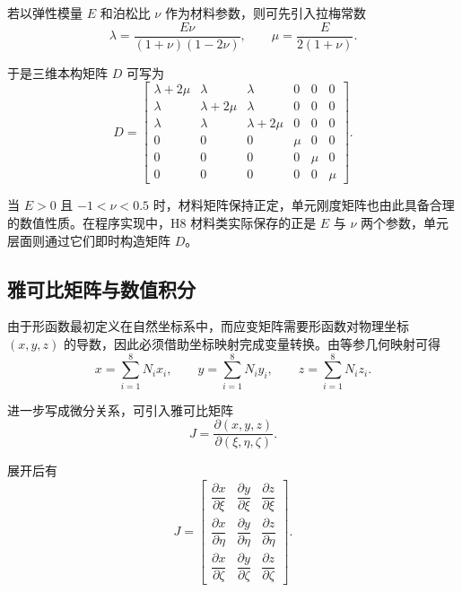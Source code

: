 \documentclass[12pt,a4paper]{article}
\begin{document}
若以弹性模量 $E$ 和泊松比 $\nu$ 作为材料参数，则可先引入拉梅常数
\begin{equation}
\lambda=\frac{E\nu}{(1+\nu)(1-2\nu)},
\qquad
\mu=\frac{E}{2(1+\nu)}.
\end{equation}

于是三维本构矩阵 $D$ 可写为
\begin{equation}
D=
\begin{bmatrix}
\lambda+2\mu & \lambda & \lambda & 0 & 0 & 0 \\
\lambda & \lambda+2\mu & \lambda & 0 & 0 & 0 \\
\lambda & \lambda & \lambda+2\mu & 0 & 0 & 0 \\
0 & 0 & 0 & \mu & 0 & 0 \\
0 & 0 & 0 & 0 & \mu & 0 \\
0 & 0 & 0 & 0 & 0 & \mu
\end{bmatrix}.
\end{equation}

当 $E>0$ 且 $-1<\nu<0.5$ 时，材料矩阵保持正定，单元刚度矩阵也由此具备合理的数值性质。在程序实现中，H8 材料类实际保存的正是 $E$ 与 $\nu$ 两个参数，单元层面则通过它们即时构造矩阵 $D$。

\subsection{雅可比矩阵与数值积分}

由于形函数最初定义在自然坐标系中，而应变矩阵需要形函数对物理坐标 $(x,y,z)$ 的导数，因此必须借助坐标映射完成变量转换。由等参几何映射可得
\begin{equation}
x=\sum_{i=1}^{8}N_i x_i,\qquad y=\sum_{i=1}^{8}N_i y_i,\qquad z=\sum_{i=1}^{8}N_i z_i.
\end{equation}

进一步写成微分关系，可引入雅可比矩阵
\begin{equation}
J = \frac{\partial(x,y,z)}{\partial(\xi,\eta,\zeta)}.
\end{equation}

展开后有
\begin{equation}
J=
\begin{bmatrix}
\dfrac{\partial x}{\partial \xi} & \dfrac{\partial y}{\partial \xi} & \dfrac{\partial z}{\partial \xi} \\
\dfrac{\partial x}{\partial \eta} & \dfrac{\partial y}{\partial \eta} & \dfrac{\partial z}{\partial \eta} \\
\dfrac{\partial x}{\partial \zeta} & \dfrac{\partial y}{\partial \zeta} & \dfrac{\partial z}{\partial \zeta}
\end{bmatrix}.
\end{equation}
\end{document}
